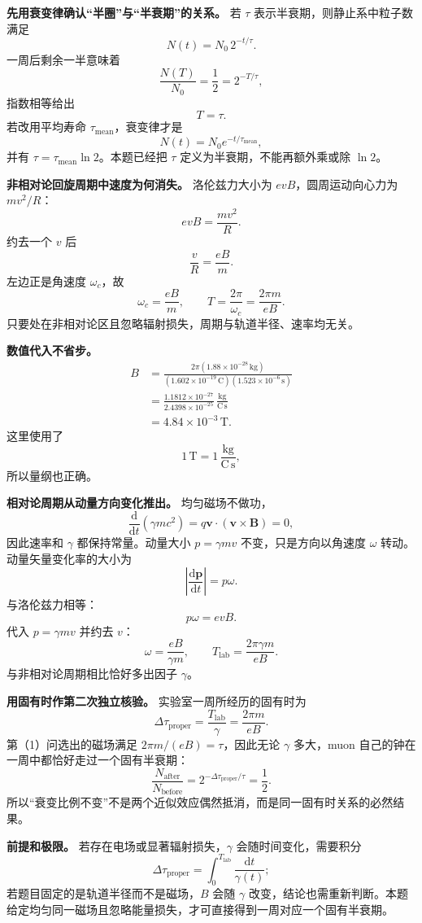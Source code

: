 \documentclass[12pt,a4paper,UTF8]{ctexart}
\begin{document}
\textbf{先用衰变律确认``半圈''与``半衰期''的关系。} 若 \(\tau\)
表示半衰期，则静止系中粒子数满足 \[
N(t)=N_0\,2^{-t/\tau}.
\] 一周后剩余一半意味着 \[
\frac{N(T)}{N_0}=\frac12
=2^{-T/\tau},
\] 指数相等给出 \[
T=\tau.
\] 若改用平均寿命 \(\tau_{\mathrm{mean}}\)，衰变律才是 \[
N(t)=N_0e^{-t/\tau_{\mathrm{mean}}},
\] 并有 \(\tau=\tau_{\mathrm{mean}}\ln2\)。本题已经把 \(\tau\)
定义为半衰期，不能再额外乘或除 \(\ln2\)。

\textbf{非相对论回旋周期中速度为何消失。} 洛伦兹力大小为
\(evB\)，圆周运动向心力为 \(mv^2/R\)： \[
evB=\frac{mv^2}{R}.
\] 约去一个 \(v\) 后 \[
\frac vR=\frac{eB}{m}.
\] 左边正是角速度 \(\omega_c\)，故 \[
\omega_c=\frac{eB}{m},
\qquad
T=\frac{2\pi}{\omega_c}=\frac{2\pi m}{eB}.
\] 只要处在非相对论区且忽略辐射损失，周期与轨道半径、速率均无关。

\textbf{数值代入不省步。} \[
\begin{aligned}
B
&=\frac{2\pi(1.88\times10^{-28}\,\mathrm{kg})}
{(1.602\times10^{-19}\,\mathrm C)
(1.523\times10^{-6}\,\mathrm s)}\\
&=\frac{1.1812\times10^{-27}}
{2.4398\times10^{-25}}\,
\frac{\mathrm{kg}}{\mathrm{C\,s}}\\
&=4.84\times10^{-3}\,\mathrm T.
\end{aligned}
\] 这里使用了 \[
1\,\mathrm T=1\,\frac{\mathrm{kg}}{\mathrm{C\,s}},
\] 所以量纲也正确。

\textbf{相对论周期从动量方向变化推出。} 均匀磁场不做功， \[
\frac{\mathrm d}{\mathrm dt}(\gamma mc^2)
=q\boldsymbol v\cdot(\boldsymbol v\times\boldsymbol B)=0,
\] 因此速率和 \(\gamma\) 都保持常量。动量大小 \(p=\gamma mv\)
不变，只是方向以角速度 \(\omega\) 转动。动量矢量变化率的大小为 \[
\left|\frac{\mathrm d\boldsymbol p}{\mathrm dt}\right|
=p\omega.
\] 与洛伦兹力相等： \[
p\omega=evB.
\] 代入 \(p=\gamma mv\) 并约去 \(v\)： \[
\omega=\frac{eB}{\gamma m},
\qquad
T_{\mathrm{lab}}=\frac{2\pi\gamma m}{eB}.
\] 与非相对论周期相比恰好多出因子 \(\gamma\)。

\textbf{用固有时作第二次独立核验。} 实验室一周所经历的固有时为 \[
\Delta\tau_{\mathrm{proper}}
=\frac{T_{\mathrm{lab}}}{\gamma}
=\frac{2\pi m}{eB}.
\] 第（1）问选出的磁场满足 \(2\pi m/(eB)=\tau\)，因此无论 \(\gamma\)
多大，muon 自己的钟在一周中都恰好走过一个固有半衰期： \[
\frac{N_{\mathrm{after}}}{N_{\mathrm{before}}}
=2^{-\Delta\tau_{\mathrm{proper}}/\tau}
=\frac12.
\]
所以``衰变比例不变''不是两个近似效应偶然抵消，而是同一固有时关系的必然结果。

\textbf{前提和极限。} 若存在电场或显著辐射损失，\(\gamma\)
会随时间变化，需要积分 \[
\Delta\tau_{\mathrm{proper}}
=\int_0^{T_{\mathrm{lab}}}\frac{\mathrm dt}{\gamma(t)};
\] 若题目固定的是轨道半径而不是磁场，\(B\) 会随 \(\gamma\)
改变，结论也需重新判断。本题给定均匀同一磁场且忽略能量损失，才可直接得到一周对应一个固有半衰期。
\end{document}
